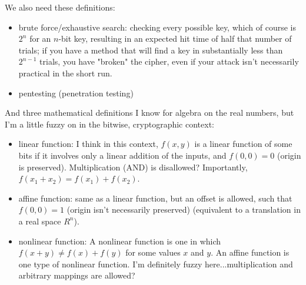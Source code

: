 We also need these definitions:

\begin{itemize}
\item brute force/exhaustive search: checking every possible key, which of
  course is $2^n$ for an $n$-bit key, resulting in an expected hit time of
  half that number of trials; if you have a method that will find a
  key in substantially less than $2^{n-1}$ trials, you have "broken" the
  cipher, even if your attack isn't necessarily practical in the short
  run.
\item pentesting (penetration testing)
\end{itemize}

And three mathematical definitions I know for algebra on the real
numbers, but I'm a little fuzzy on in the bitwise, cryptographic
context:

\begin{itemize}
\item linear function: I think in this context, $f(x,y)$ is a linear
  function of some bits if it involves only a linear addition of
  the inputs, and $f(0,0) = 0$ (origin is preserved).  Multiplication
  (AND) is disallowed?  Importantly, $f(x_1 + x_2) = f(x_1) + f(x_2)$.
\item affine function: same as a linear function, but an offset is
  allowed, such that $f(0,0) = 1$ (origin isn't necessarily preserved)
  (equivalent to a translation in a real space $R^n$).
\item nonlinear function: A nonlinear function is one in which $f(x+y) \ne f(x) + f(y)$ for some values $x$ and $y$. An affine function is one type of nonlinear function. I'm definitely fuzzy here...multiplication and
  arbitrary mappings are allowed?
\end{itemize}

